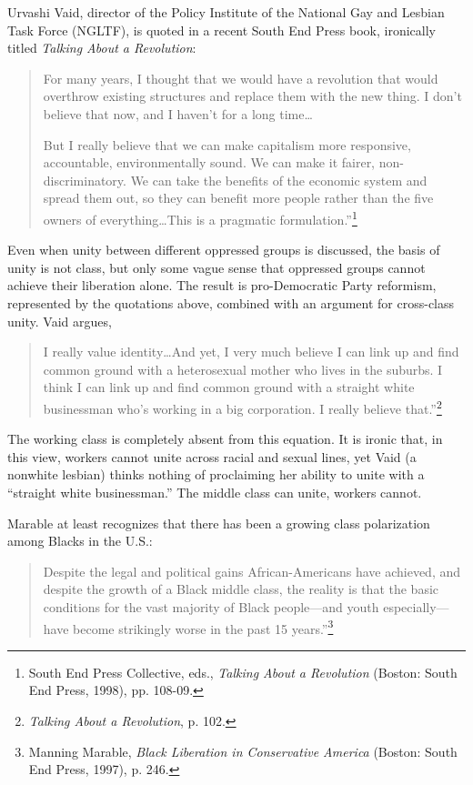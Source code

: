 Urvashi Vaid, director of the Policy Institute of the National Gay and Lesbian Task Force (NGLTF), is quoted in a recent South End Press book, ironically titled \emph{Talking About a Revolution}:

\blockquote{For many years, I thought that we would have a revolution that would overthrow existing structures and replace them with the new thing. I don't believe that now, and I haven't for a long time\ldots

But I really believe that we can make capitalism more responsive, accountable, environmentally sound. We can make it fairer, non-discriminatory. We can take the benefits of the economic system and spread them out, so they can benefit more people rather than the five owners of everything\ldots This is a pragmatic formulation.''\footnote{South End Press Collective, eds., \emph{Talking About a Revolution} (Boston: South End Press, 1998), pp. 108-09.}}

Even when unity between different oppressed groups is discussed, the basis of unity is not class, but only some vague sense that oppressed groups cannot achieve their liberation alone. The result is pro-Democratic Party reformism, represented by the quotations above, combined with an argument for cross-class unity. Vaid argues,

\blockquote{I really value identity\ldots And yet, I very much believe I can link up and find common ground with a heterosexual mother who lives in the suburbs. I think I can link up and find common ground with a straight white businessman who's working in a big corporation. I really believe that.''\footnote{\emph{Talking About a Revolution}, p. 102.}}

The working class is completely absent from this equation. It is ironic that, in this view, workers cannot unite across racial and sexual lines, yet Vaid (a nonwhite lesbian) thinks nothing of proclaiming her ability to unite with a ``straight white businessman.'' The middle class can unite, workers cannot.

Marable at least recognizes that there has been a growing class polarization among Blacks in the U.S.:

\blockquote{Despite the legal and political gains African-Americans have achieved, and despite the growth of a Black middle class, the reality is that the basic conditions for the vast majority of Black people---and youth especially---have become strikingly worse in the past 15 years.''\footnote{Manning Marable, \emph{Black Liberation in Conservative America} (Boston: South End Press, 1997), p. 246.}}

